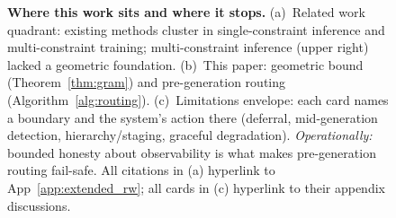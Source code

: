 \begin{figure}[!htb]
\begin{minipage}[t]{0.31\linewidth}
\end{minipage}
\caption{\textbf{Where this work sits and where it stops.} (a)~Related work quadrant: existing methods cluster in single-constraint inference and multi-constraint training; multi-constraint inference (upper right) lacked a geometric foundation. (b)~This paper: geometric bound (Theorem~\ref{thm:gram}) and pre-generation routing (Algorithm~\ref{alg:routing}). (c)~Limitations envelope: each card names a boundary and the system's action there (deferral, mid-generation detection, hierarchy/staging, graceful degradation). \emph{Operationally:} bounded honesty about observability is what makes pre-generation routing fail-safe. All citations in (a) hyperlink to App~\ref{app:extended_rw}; all cards in (c) hyperlink to their appendix discussions.}
\label{fig:rw_quadrant}\label{fig:limitations_envelope}
\end{figure}
